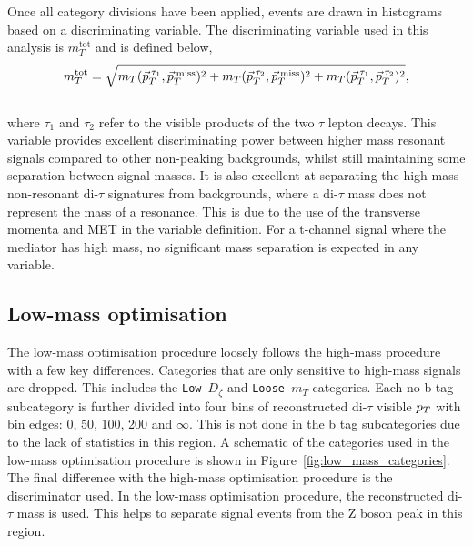 Once all category divisions have been applied, events are drawn in histograms based on a discriminating variable.
The discriminating variable used in this analysis is $m_{T}^{\text{tot}}$ and is defined below, \\
\begin{equation}
m_{T}^\text{tot} = \sqrt{m_{T}(\vec{p}_{T}^{\hspace{2pt}\tau_1},\vec{p}_{T}^{\hspace{2pt}\text{miss}})^2 +  m_{T}(\vec{p}_{T}^{\hspace{2pt}\tau_2},\vec{p}_{T}^{\hspace{2pt}\text{miss}})^2 + m_{T}(\vec{p}_{T}^{\hspace{2pt}\tau_1},\vec{p}_{T}^{\hspace{2pt}\tau_2})^2},
\label{eqn:mt_tot}
\end{equation} \\
where $\tau_1$ and $\tau_2$ refer to the visible products of the two $\tau$ lepton decays.
This variable provides excellent discriminating power between higher mass resonant signals compared to other non-peaking backgrounds, whilst still maintaining some separation between signal masses.
It is also excellent at separating the high-mass non-resonant di-$\tau$ signatures from backgrounds, where a di-$\tau$ mass does not represent the mass of a resonance.
This is due to the use of the transverse momenta and \ac{MET} in the variable definition.
For a t-channel signal where the mediator has high mass, no significant mass separation is expected in any variable. \\

\subsection{Low-mass optimisation}

The low-mass optimisation procedure loosely follows the high-mass procedure with a few key differences.
Categories that are only sensitive to high-mass signals are dropped.
This includes the \texttt{Low-$D_\zeta$} and \texttt{Loose-$m_{T}$} categories.
Each no b tag subcategory is further divided into four bins of reconstructed di-$\tau$ visible $p_{T}$ with bin edges: 0, 50, 100, 200 and $\infty$.
This is not done in the b tag subcategories due to the lack of statistics in this region.
A schematic of the categories used in the low-mass optimisation procedure is shown in Figure~\ref{fig:low_mass_categories}.
The final difference with the high-mass optimisation procedure is the discriminator used.
In the low-mass optimisation procedure, the reconstructed di-$\tau$ mass is used.
This helps to separate signal events from the Z boson peak in this region. \\

